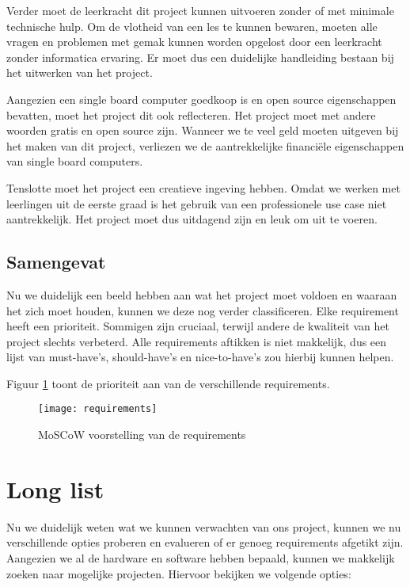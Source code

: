 Verder moet de leerkracht dit project kunnen uitvoeren zonder of met minimale technische hulp. Om de vlotheid van een les te kunnen bewaren, moeten alle vragen en problemen met gemak kunnen worden opgelost door een leerkracht zonder informatica ervaring. Er moet dus een duidelijke handleiding bestaan bij het uitwerken van het project.

Aangezien een single board computer goedkoop is en open source eigenschappen bevatten, moet het project dit ook reflecteren. Het project moet met andere woorden gratis en open source zijn. Wanneer we te veel geld moeten uitgeven bij het maken van dit project, verliezen we de aantrekkelijke financiële eigenschappen van single board computers. 

Tenslotte moet het project een creatieve ingeving hebben. Omdat we werken met leerlingen uit de eerste graad is het gebruik van een professionele use case niet aantrekkelijk. Het project moet dus uitdagend zijn en leuk om uit te voeren.

\subsection{Samengevat}

Nu we duidelijk een beeld hebben aan wat het project moet voldoen en waaraan het zich moet houden, kunnen we deze nog verder classificeren. Elke requirement heeft een prioriteit. Sommigen zijn cruciaal, terwijl andere de kwaliteit van het project slechts verbeterd. Alle requirements aftikken is niet makkelijk, dus een lijst van must-have’s, should-have’s en nice-to-have’s zou hierbij kunnen helpen.


Figuur \ref{fig:moscow} toont de prioriteit aan van de verschillende requirements.

\begin{figure}
   \texttt{[image: requirements]}
   \caption{MoSCoW voorstelling van de requirements}
   \label{fig:moscow}
\end{figure}

\section{Long list}

Nu we duidelijk weten wat we kunnen verwachten van ons project, kunnen we nu verschillende opties proberen en evalueren of er genoeg requirements afgetikt zijn. Aangezien we al de hardware en software hebben bepaald, kunnen we makkelijk zoeken naar mogelijke projecten. Hiervoor bekijken we volgende opties:

